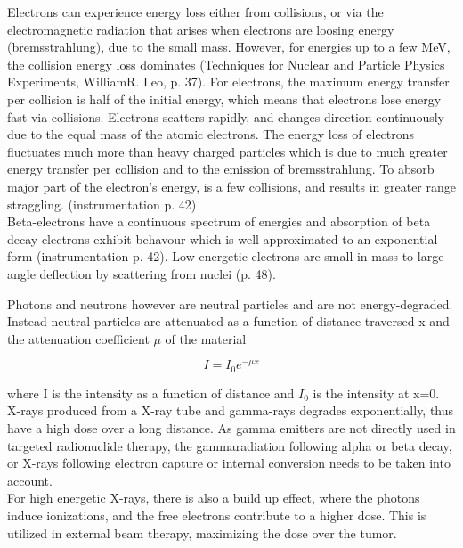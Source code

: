 Electrons can experience energy loss either  from  collisions, or via the electromagnetic radiation that arises when electrons are loosing energy (bremsstrahlung), due to the small mass. However, for energies up to a few MeV, the collision energy loss dominates (Techniques for Nuclear and Particle Physics Experiments, WilliamR. Leo, p.  37). For electrons, the maximum energy transfer per collision is half of the initial energy, which means that electrons lose energy fast via collisions. Electrons scatters rapidly, and changes direction continuously due to the equal mass of the atomic electrons. The energy loss of electrons fluctuates much more than heavy charged particles which is due to much greater energy transfer per collision and to the emission of bremsstrahlung. To absorb major part of the electron's energy, is a few collisions, and results in greater range straggling.  (instrumentation p. 42)\\
 
Beta-electrons have a continuous spectrum of energies and absorption of beta decay electrons exhibit behavour which is well approximated to an exponential form (instrumentation p. 42). 
Low energetic electrons are small in mass to large angle deflection by scattering from nuclei (p. 48). 

Photons and neutrons however are neutral particles and are not energy-degraded. Instead neutral particles are attenuated as a function of distance traversed x and the attenuation coefficient $\mu$ of the material 

\begin{equation}
    I = I_0 e^{-\mu x}
\end{equation}

where I is the intensity as a function of distance and $I_0$ is the intensity at x=0. 
 X-rays produced from a X-ray tube and gamma-rays degrades exponentially, thus have a high dose over a long distance. As gamma emitters are not directly used in targeted  radionuclide therapy, the gammaradiation following alpha or beta decay, or X-rays following electron capture or internal conversion needs to be taken into account.\\
 For high energetic X-rays, there is also a build up effect, where the photons induce ionizations, and the free electrons contribute to a higher dose. This is utilized in external beam therapy, maximizing the dose over the tumor. \\

